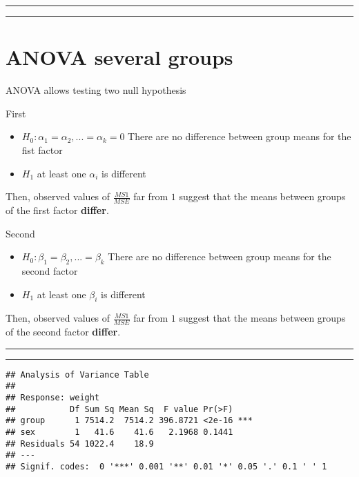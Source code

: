 \documentclass[
]{book}
\begin{document}
\begin{center}\rule{0.5\linewidth}{0.5pt}\end{center}

\begin{center}\rule{0.5\linewidth}{0.5pt}\end{center}

\hypertarget{anova-several-groups-5}{%
\section{ANOVA several groups}\label{anova-several-groups-5}}

ANOVA allows testing two null hypothesis

First

\begin{itemize}
\item
  \(H_0: \alpha_1=\alpha_2, ...=\alpha_k=0\) There are no difference between group means for the fist factor
\item
  \(H_1\) at least one \(\alpha_i\) is different
\end{itemize}

Then, observed values of \(\frac{MS1}{MSE}\) far from \(1\) suggest that the means between groups of the first factor \textbf{differ}.

Second

\begin{itemize}
\item
  \(H_0: \beta_1=\beta_2, ...=\beta_k\) There are no difference between group means for the second factor
\item
  \(H_1\) at least one \(\beta_i\) is different
\end{itemize}

Then, observed values of \(\frac{MS1}{MSE}\) far from \(1\) suggest that the means between groups of the second factor \textbf{differ}.

\begin{center}\rule{0.5\linewidth}{0.5pt}\end{center}

\begin{center}\rule{0.5\linewidth}{0.5pt}\end{center}

\begin{verbatim}
## Analysis of Variance Table
## 
## Response: weight
##           Df Sum Sq Mean Sq  F value Pr(>F)    
## group      1 7514.2  7514.2 396.8721 <2e-16 ***
## sex        1   41.6    41.6   2.1968 0.1441    
## Residuals 54 1022.4    18.9                    
## ---
## Signif. codes:  0 '***' 0.001 '**' 0.01 '*' 0.05 '.' 0.1 ' ' 1
\end{verbatim}
\end{document}
